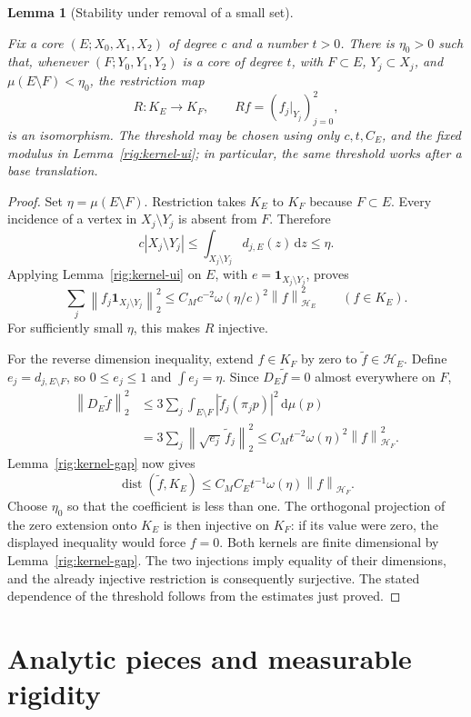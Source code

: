 \documentclass[11pt]{amsart}
\newcommand{\dd}{\,\mathrm d}
\newcommand{\one}{\mathbf 1}
\newcommand{\norm}[1]{\left\|#1\right\|}
\newtheorem{lemma}[theorem]{Lemma}
\theoremstyle{definition}
\theoremstyle{remark}
\numberwithin{equation}{section}
\providecommand{\lean}[1]{}
\providecommand{\leanok}{}
\begin{document}
\begin{lemma}[Stability under removal of a small set]\label{rig:kernel-stability}
\lean{Auto.rig_kernel_stability}
\leanok
Fix a core $(E;X_0,X_1,X_2)$ of degree $c$ and a number $t>0$.
There is $\eta_0>0$ such that, whenever
$(F;Y_0,Y_1,Y_2)$ is a core of degree $t$, with
$F\subset E$, $Y_j\subset X_j$, and $\mu(E\setminus F)<\eta_0$,
the restriction map
\[
 R:K_E\longrightarrow K_F,\qquad Rf=(f_j|_{Y_j})_{j=0}^2,
\]
is an isomorphism. The threshold may be chosen using only
$c,t,C_E$, and the fixed modulus in Lemma~\ref{rig:kernel-ui}; in
particular, the same threshold works after a base translation.
\end{lemma}
\begin{proof}
Set $\eta=\mu(E\setminus F)$. Restriction takes $K_E$ to $K_F$ because
$F\subset E$. Every incidence of a vertex in $X_j\setminus Y_j$ is
absent from $F$. Therefore
\[
 c|X_j\setminus Y_j|
 \le\int_{X_j\setminus Y_j}d_{j,E}(z)\dd z\le\eta.
\]
Applying Lemma~\ref{rig:kernel-ui} on $E$, with
$e=\one_{X_j\setminus Y_j}$, proves
\[
 \sum_j\norm{f_j\one_{X_j\setminus Y_j}}_2^2
 \le C_Mc^{-2}\omega(\eta/c)^2\norm f_{\mathcal H_E}^2
 \qquad(f\in K_E).
\]
For sufficiently small $\eta$, this makes $R$ injective.

For the reverse dimension inequality, extend $f\in K_F$ by zero to
$\widetilde f\in\mathcal H_E$. Define
$e_j=d_{j,E\setminus F}$, so $0\le e_j\le1$ and $\int e_j=\eta$.
Since $D_E\widetilde f=0$ almost everywhere on $F$,
\begin{align*}
 \norm{D_E\widetilde f}_2^2
 &\le3\sum_j\int_{E\setminus F}|\widetilde f_j(\pi_jp)|^2\dd\mu(p)\\
 &=3\sum_j\norm{\sqrt{e_j}\,\widetilde f_j}_2^2
 \le C_Mt^{-2}\omega(\eta)^2\norm f_{\mathcal H_F}^2.
\end{align*}
Lemma~\ref{rig:kernel-gap} now gives
\[
 \operatorname{dist}(\widetilde f,K_E)
 \le C_MC_Et^{-1}\omega(\eta)\norm f_{\mathcal H_F}.
\]
Choose $\eta_0$ so that the coefficient is less than one. The orthogonal
projection of the zero extension onto $K_E$ is then injective on $K_F$:
if its value were zero, the displayed inequality would force $f=0$.
Both kernels are finite dimensional by Lemma~\ref{rig:kernel-gap}.
The two injections imply equality of their dimensions, and the already
injective restriction is consequently surjective. The stated dependence
of the threshold follows from the estimates just proved.
\end{proof}

\section{Analytic pieces and measurable rigidity}
\end{document}
